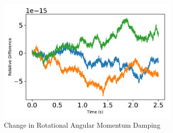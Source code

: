 \begin{figure}[htbp]\centerline{\includegraphics[width=0.8\textwidth]{AutoTeX/ChangeInRotationalAngularMomentumDamping}}\caption{Change in Rotational Angular Momentum Damping}\label{fig:ChangeInRotationalAngularMomentumDamping}\end{figure}